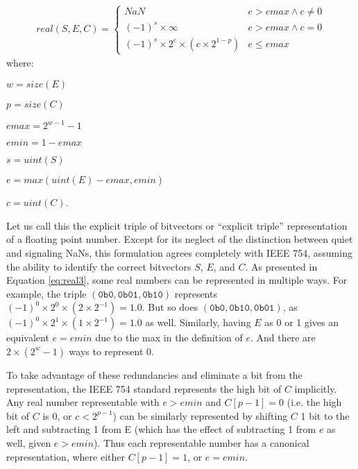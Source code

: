 \documentclass[letterpaper,10pt]{article}
\begin{document}
\begin{align} \label{eq:real3}
 real(S, E, C) =
 \begin{cases}
  NaN                                           & e > emax \land c \neq 0 \\
  (-1)^s \times \infty                          & e > emax \land c = 0    \\
  (-1)^s \times 2^e \times (c \times 2^{1 - p}) & e \leq emax
 \end{cases}
\end{align}
where:
\begin{description}
 \item $w = size(E)$
 \item $p = size(C)$
 \item $emax = 2^{w-1} - 1$
 \item $emin = 1 - emax$
 \item $s = uint(S)$
 \item $e = max(uint(E) - emax, emin)$
 \item $c = uint(C)$.
\end{description}

Let us call this the explicit triple of bitvectors or ``explicit triple'' representation of a floating point number. Except for its neglect of the distinction between quiet and signaling NaNs, this formulation agrees completely with IEEE 754, assuming the ability to identify the correct bitvectors $S$, $E$, and $C$. As presented in Equation \ref{eq:real3}, some real numbers can be represented in multiple ways. For example, the triple $(\texttt{0b0}, \texttt{0b01}, \texttt{0b10})$ represents $(-1)^0 \times 2^0 \times (2 \times 2^{-1}) = 1.0$. But so does $(\texttt{0b0}, \texttt{0b10}, \texttt{0b01})$, as $(-1)^0 \times 2^1 \times (1 \times 2^{-1}) = 1.0$ as well. Similarly, having $E$ as 0 or 1 gives an equivalent $e = emin$ due to the max in the definition of $e$. And there are $2 \times (2^w - 1)$ ways to represent 0.

To take advantage of these redundancies and eliminate a bit from the representation, the IEEE 754 standard represents the high bit of $C$ implicitly. Any real number representable with $e > emin$ and $C[p-1] = 0$ (i.e. the high bit of $C$ is 0, or $c < 2^{p-1}$) can be similarly represented by shifting $C$ 1 bit to the left and subtracting 1 from E (which has the effect of subtracting 1 from $e$ as well, given $e > emin$). Thus each representable number has a canonical representation, where either $C[p-1] = 1$, or $e = emin$. 
\end{document}

